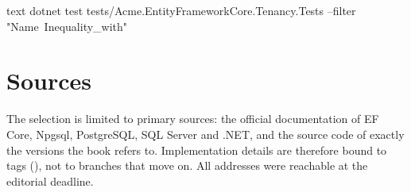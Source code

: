 \begin{sourcecode}[Shell]{text}
dotnet test tests/Acme.EntityFrameworkCore.Tenancy.Tests --filter "Name~Inequality_with"
\end{sourcecode}

\chapter{Sources}\label{app:F}

The selection is limited to primary sources: the official documentation of EF Core, Npgsql,
PostgreSQL, SQL Server and .NET, and the source code of exactly the versions the book refers
to. Implementation details are therefore bound to tags (), not to branches that
move on. All addresses were reachable at the editorial deadline.


